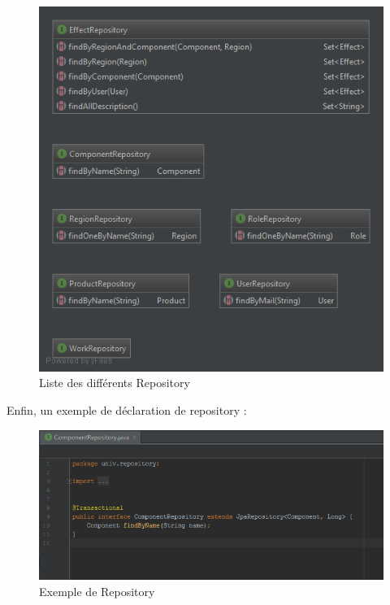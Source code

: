 \documentclass[a4paper]{article}
\begin{document}
\begin{figure}[h]
\centering
\includegraphics[scale=.8]{resources/diag_repos.png}
\caption{Liste des différents Repository}
\end{figure}

\newpage

\vspace*{0.5cm}

Enfin, un exemple de déclaration de repository :

\begin{figure}[h]
\centering
\includegraphics[scale=.8]{resources/exemple_repos.png}
\caption{Exemple de Repository}
\end{figure}
\end{document}
